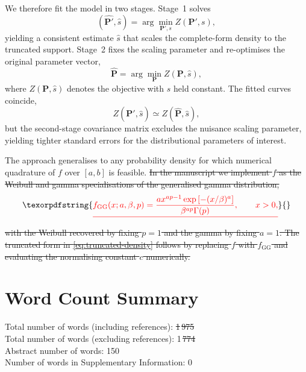 \documentclass[12pt]{article}
\providecommand{\DIFaddtex}[1]{{\protect\color{blue}\uwave{#1}}} %
\providecommand{\DIFdeltex}[1]{{\protect\color{red}\sout{#1}}}                      %
\providecommand{\DIFaddbegin}{} %
\providecommand{\DIFaddend}{} %
\providecommand{\DIFdelbegin}{} %
\providecommand{\DIFdelend}{} %
\providecommand{\DIFadd}[1]{\texorpdfstring{\DIFaddtex{#1}}{#1}} %
\providecommand{\DIFdel}[1]{\texorpdfstring{\DIFdeltex{#1}}{}} %
\newcommand{\DIFscaledelfig}{0.5}
\newlength{\DIFdelgraphicswidth} %
\newlength{\DIFdelgraphicsheight} %
\newcommand{\DIFaddincludegraphics}[2][]{{\color{blue}\fbox{\DIFOincludegraphics[#1]{#2}}}} %
\newcommand{\DIFdelincludegraphics}[2][]{%
\sbox{\DIFdelgraphicsbox}{\DIFOincludegraphics[#1]{#2}}%
\settoboxwidth{\DIFdelgraphicswidth}{\DIFdelgraphicsbox} %
\settoboxtotalheight{\DIFdelgraphicsheight}{\DIFdelgraphicsbox} %
\scalebox{\DIFscaledelfig}{%
\parbox[b]{\DIFdelgraphicswidth}{\usebox{\DIFdelgraphicsbox}\\[-\baselineskip] \rule{\DIFdelgraphicswidth}{0em}}\llap{\resizebox{\DIFdelgraphicswidth}{\DIFdelgraphicsheight}{%
\setlength{\unitlength}{\DIFdelgraphicswidth}%
\begin{picture}(1,1)%
\thicklines\linethickness{2pt} %
{\color[rgb]{1,0,0}\put(0,0){\framebox(1,1){}}}%
{\color[rgb]{1,0,0}\put(0,0){\line( 1,1){1}}}%
{\color[rgb]{1,0,0}\put(0,1){\line(1,-1){1}}}%
\end{picture}%
}\hspace*{3pt}}} %
} %
\DeclareRobustCommand{\DIFaddbegin}{\DIFOaddbegin \let\includegraphics\DIFaddincludegraphics} %
\DeclareRobustCommand{\DIFaddend}{\DIFOaddend \let\includegraphics\DIFOincludegraphics} %
\DeclareRobustCommand{\DIFdelbegin}{\DIFOdelbegin \let\includegraphics\DIFdelincludegraphics} %
\DeclareRobustCommand{\DIFdelend}{\DIFOaddend \let\includegraphics\DIFOincludegraphics} %
\begin{document}
\DIFaddend We therefore fit the model in two stages. Stage~1 solves
\begin{equation}
  (\widehat{\bm{P}'}, \hat{s}) = \arg\min_{\bm{P}', s} Z(\bm{P}', s),
\end{equation}
yielding a consistent estimate $\hat{s}$ that scales the complete-form density to the truncated support. Stage~2 fixes the scaling parameter and re-optimises the original parameter vector,
\begin{equation}
  \widehat{\bm{P}} = \arg\min_{\bm{P}} Z(\bm{P}, \hat{s}),
\end{equation}
where $Z(\bm{P}, \hat{s})$ denotes the objective with $s$ held constant. The fitted curves coincide,
\begin{equation}
  Z(\widehat{\bm{P}'}, \hat{s}) \simeq Z(\widehat{\bm{P}}, \hat{s}),
\end{equation}
but the second-stage covariance matrix excludes the nuisance scaling parameter, yielding tighter standard errors for the distributional parameters of interest.

The approach generalises to any probability density for which numerical quadrature of $f$ over $[a, b]$ is feasible.
\DIFdelbegin \DIFdel{In the manuscript we implement $f$ as the Weibull and gamma specialisations of the generalised gamma distribution,
}\begin{displaymath}
  \DIFdel{f_{\mathrm{GG}}(x; a, \beta, p) = \frac{a x^{ap - 1} \exp\left[-(x / \beta)^a\right]}{\beta^{ap} \Gamma(p)}, \qquad x > 0,
}\end{displaymath}%
\DIFdel{with the Weibull recovered by fixing $p = 1$ and the gamma by fixing $a = 1$. The truncated form in \eqref{eq:truncated-density} follows by replacing $f$ with $f_{\mathrm{GG}}$ and evaluating the normalising constant $c$ numerically.
}\DIFdelend 


\section*{Word Count Summary}
Total number of words (including references): \DIFdelbegin \DIFdel{1}\DIFdelend \DIFaddbegin \DIFadd{2}\DIFaddend \,\DIFdelbegin \DIFdel{975}\DIFdelend \DIFaddbegin \DIFadd{357}\DIFaddend \\
Total number of words (excluding references): 1\,\DIFdelbegin \DIFdel{774}\DIFdelend \DIFaddbegin \DIFadd{998}\DIFaddend \\
Abstract number of words: 150\\
Number of words in Supplementary Information: 0

\DIFdelbegin %
\DIFdelend \DIFaddbegin 
\DIFaddend 
\end{document}
